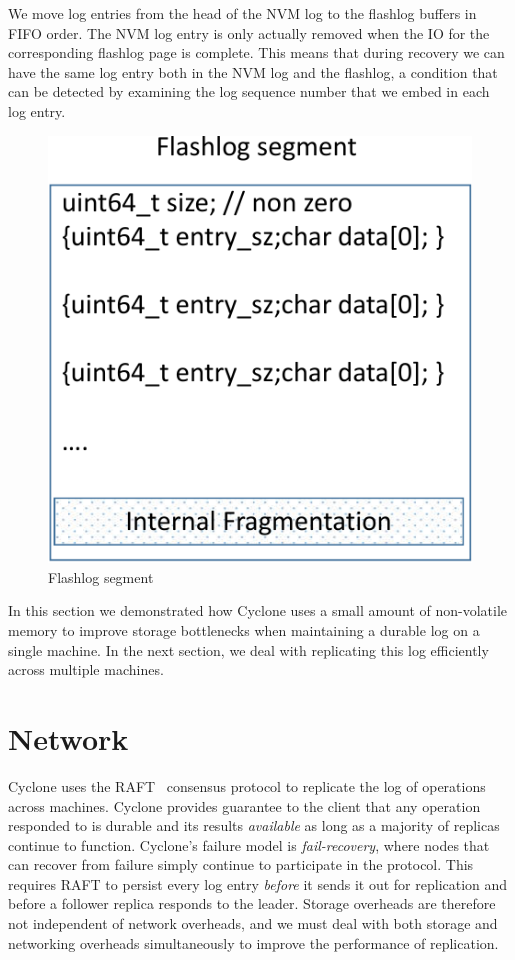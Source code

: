 \documentclass[twocolumn]{article}
\begin{document}
We move log entries from the head of the NVM log to the flashlog buffers in FIFO
order. The NVM log entry is only actually removed when the IO for the
corresponding flashlog page is complete. This means that during recovery we can
have the same log entry both in the NVM log and the flashlog, a condition that
can be detected by examining the log sequence number that we embed in each log
entry.

\begin{figure}
  \centering
  \includegraphics[scale=0.6]{figures2/flashlog_page.pdf}
  \caption{Flashlog segment}
  \label{fig:flashlog_page}
\end{figure}

In this section we demonstrated how Cyclone uses a small amount of non-volatile
memory to improve storage bottlenecks when maintaining a durable log on a single
machine. In the next section, we deal with replicating this log efficiently
across multiple machines.

\section{Network}
\label{sec:network}
Cyclone uses the RAFT~\cite{raft} consensus protocol to replicate the log of
operations across machines. Cyclone provides guarantee to the client that any
operation responded to is durable and its results \emph{available} as long as a
majority of replicas continue to function. Cyclone's failure model is
\emph{fail-recovery}, where nodes that can recover from failure simply continue
to participate in the protocol. This requires RAFT to persist every log entry
\emph{before} it sends it out for replication and before a follower replica
responds to the leader. Storage overheads are therefore not independent of
network overheads, and we must deal with both storage and networking overheads
simultaneously to improve the performance of replication.
\end{document}
